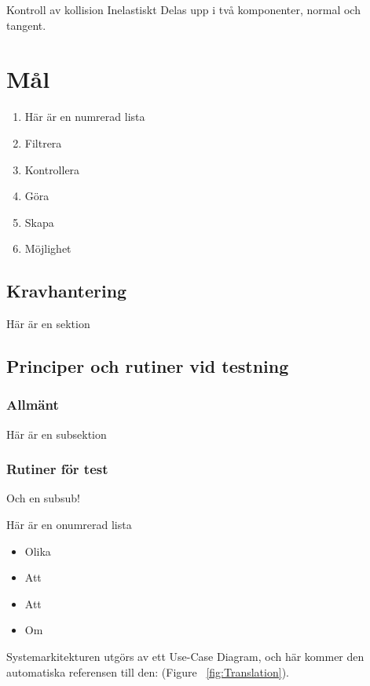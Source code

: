 \documentclass[11pt]{article} %
\begin{document}
Kontroll av kollision
Inelastiskt
Delas upp i två komponenter, normal och tangent.




\section{Mål}



\begin{enumerate}
\item Här är en numrerad lista
\item Filtrera 
\item Kontrollera 
\item Göra 
\item Skapa 
\item Möjlighet 
\end{enumerate}


\pagebreak 



\subsection{Kravhantering}

Här är en sektion

\subsection{Principer och rutiner vid testning}

\subsubsection{Allmänt}
Här är en subsektion

\subsubsection{Rutiner för test}
Och en subsub!

Här är en onumrerad lista
\begin{itemize}
\item Olika
\item Att 
\item Att
\item Om 
\end{itemize}



Systemarkitekturen utgörs av ett Use-Case Diagram, och här kommer den automatiska referensen till den:   (Figure ~\ref{fig:Translation}).
\end{document}
